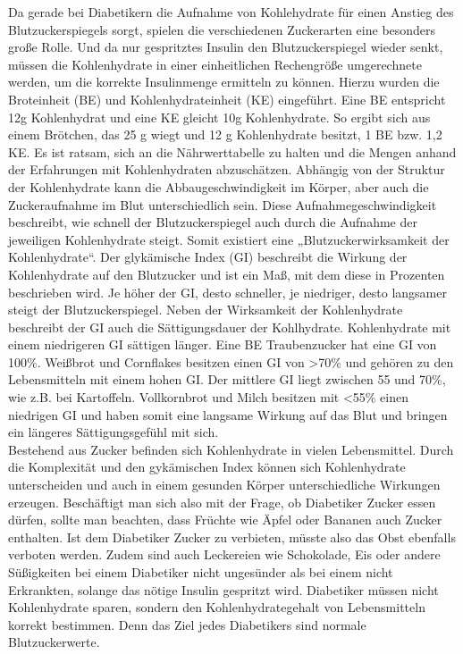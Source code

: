		Da gerade bei Diabetikern die Aufnahme von Kohlehydrate für einen Anstieg des Blutzuckerspiegels sorgt, spielen die verschiedenen Zuckerarten eine besonders große Rolle. Und da nur gespritztes Insulin den Blutzuckerspiegel wieder senkt, müssen die Kohlenhydrate in einer einheitlichen Rechengröße umgerechnete werden, um die korrekte Insulinmenge ermitteln zu können. Hierzu wurden die Broteinheit (BE) und Kohlenhydrateinheit (KE) eingeführt. Eine BE entspricht 12g Kohlenhydrat und eine KE gleicht 10g Kohlenhydrate. So ergibt sich aus einem Brötchen, das 25 g wiegt und 12 g Kohlenhydrate besitzt, 1 BE bzw. 1,2 KE. Es ist ratsam, sich an die Nährwerttabelle zu halten und die Mengen anhand der Erfahrungen mit Kohlenhydraten abzuschätzen.\newline
		Abhängig von der Struktur der Kohlenhydrate kann die Abbaugeschwindigkeit im Körper, aber auch die Zuckeraufnahme im Blut unterschiedlich sein. Diese Aufnahmegeschwindigkeit beschreibt, wie schnell der Blutzuckerspiegel auch durch die Aufnahme der jeweiligen Kohlenhydrate steigt. Somit existiert eine „Blutzuckerwirksamkeit der Kohlenhydrate“. Der glykämische Index (GI) beschreibt die Wirkung der Kohlenhydrate auf den Blutzucker und ist ein Maß, mit dem diese in Prozenten beschrieben wird. Je höher der GI, desto schneller, je niedriger, desto langsamer steigt der Blutzuckerspiegel. Neben der Wirksamkeit der Kohlenhydrate beschreibt der GI auch die Sättigungsdauer der Kohlhydrate. Kohlenhydrate mit einem niedrigeren GI sättigen länger. \newline
		Eine BE Traubenzucker hat eine GI von 100\%. Weißbrot und Cornflakes besitzen einen GI von >70\% und gehören zu den Lebensmitteln mit einem hohen GI. Der mittlere GI liegt zwischen 55 und 70\%, wie z.B. bei Kartoffeln. Vollkornbrot und Milch besitzen mit <55\% einen niedrigen GI und haben somit eine langsame Wirkung auf das Blut und bringen ein längeres Sättigungsgefühl mit sich.\cite{SG}\\
		Bestehend aus Zucker befinden sich Kohlenhydrate in vielen Lebensmittel. Durch die Komplexität und den gykämischen Index können sich Kohlenhydrate unterscheiden und auch in einem gesunden Körper unterschiedliche Wirkungen erzeugen. Beschäftigt man sich also mit der Frage, ob Diabetiker Zucker essen dürfen, sollte man beachten, dass Früchte wie Äpfel oder Bananen auch Zucker enthalten. Ist dem Diabetiker Zucker zu verbieten, müsste also das Obst ebenfalls verboten werden. Zudem sind auch Leckereien wie Schokolade, Eis oder andere Süßigkeiten bei einem Diabetiker nicht ungesünder als bei einem nicht Erkrankten, solange das nötige Insulin gespritzt wird. Diabetiker müssen nicht Kohlenhydrate sparen, sondern den Kohlenhydrategehalt von Lebensmitteln korrekt bestimmen. Denn das Ziel jedes Diabetikers sind normale Blutzuckerwerte.\cite{SG}		
